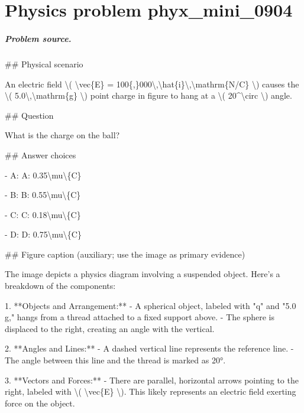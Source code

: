 
\chapter{Physics problem phyx\_mini\_0904}
\label{ch:PhyXMiniProblems_problem_phyx_mini_0904}

\paragraph{Problem source.}
\#\# Physical scenario

An electric field \textbackslash{}( \textbackslash{}vec\{E\} = 100\{,\}000\textbackslash{},\textbackslash{}hat\{i\}\textbackslash{},\textbackslash{}mathrm\{N/C\} \textbackslash{}) causes the \textbackslash{}( 5.0\textbackslash{},\textbackslash{}mathrm\{g\} \textbackslash{}) point charge in figure to hang at a \textbackslash{}( 20\textasciicircum{}\textbackslash{}circ \textbackslash{}) angle.

\#\# Question

What is the charge on the ball?

\#\# Answer choices

- A: A: 0.35\textbackslash{}mu\textbackslash{}\{C\}

- B: B: 0.55\textbackslash{}mu\textbackslash{}\{C\}

- C: C: 0.18\textbackslash{}mu\textbackslash{}\{C\}

- D: D: 0.75\textbackslash{}mu\textbackslash{}\{C\}

\#\# Figure caption (auxiliary; use the image as primary evidence)

The image depicts a physics diagram involving a suspended object. Here's a breakdown of the components:

1. **Objects and Arrangement:**
   - A spherical object, labeled with "q" and "5.0 g," hangs from a thread attached to a fixed support above. 
   - The sphere is displaced to the right, creating an angle with the vertical.

2. **Angles and Lines:**
   - A dashed vertical line represents the reference line. 
   - The angle between this line and the thread is marked as 20°.

3. **Vectors and Forces:**
   - There are parallel, horizontal arrows pointing to the right, labeled with \textbackslash{}( \textbackslash{}vec\{E\} \textbackslash{}). This likely represents an electric field exerting force on the object.

